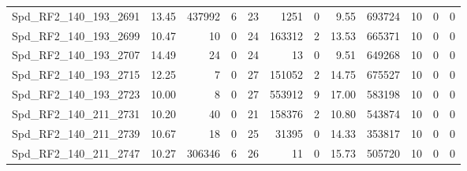 \begin{longtable}[c]{@{}lrrrrrrrrrrr@{}}
Spd\_RF2\_140\_193\_2691      & 13.45                  & 437992                  & 6                       & 23                     & 1251                    & 0                       & 9.55                    & 693724                   & 10                       & 0                        & 0                        \\
Spd\_RF2\_140\_193\_2699      & 10.47                  & 10                      & 0                       & 24                     & 163312                  & 2                       & 13.53                   & 665371                   & 10                       & 0                        & 0                        \\
Spd\_RF2\_140\_193\_2707      & 14.49                  & 24                      & 0                       & 24                     & 13                      & 0                       & 9.51                    & 649268                   & 10                       & 0                        & 0                        \\
Spd\_RF2\_140\_193\_2715      & 12.25                  & 7                       & 0                       & 27                     & 151052                  & 2                       & 14.75                   & 675527                   & 10                       & 0                        & 0                        \\
Spd\_RF2\_140\_193\_2723      & 10.00                  & 8                       & 0                       & 27                     & 553912                  & 9                       & 17.00                   & 583198                   & 10                       & 0                        & 0                        \\
Spd\_RF2\_140\_211\_2731      & 10.20                  & 40                      & 0                       & 21                     & 158376                  & 2                       & 10.80                   & 543874                   & 10                       & 0                        & 0                        \\
Spd\_RF2\_140\_211\_2739      & 10.67                  & 18                      & 0                       & 25                     & 31395                   & 0                       & 14.33                   & 353817                   & 10                       & 0                        & 0                        \\
Spd\_RF2\_140\_211\_2747      & 10.27                  & 306346                  & 6                       & 26                     & 11                      & 0                       & 15.73                   & 505720                   & 10                       & 0                        & 0                        \\

\end{longtable}
